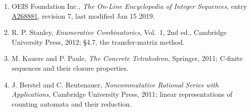 \documentclass[11pt]{article}
\theoremstyle{definition}
\begin{document}
\begin{enumerate}

\item OEIS Foundation Inc., \emph{The On-Line Encyclopedia of Integer Sequences}, entry \href{https://oeis.org/A268881}{A268881}, revision 7, last modified Jan 15 2019.

\item R. P. Stanley, \emph{Enumerative Combinatorics}, Vol.~1, 2nd ed., Cambridge University Press, 2012; \S4.7, the transfer-matrix method.

\item M. Kauers and P. Paule, \emph{The Concrete Tetrahedron}, Springer, 2011; C-finite sequences and their closure properties.

\item J. Berstel and C. Reutenauer, \emph{Noncommutative Rational Series with Applications}, Cambridge University Press, 2011; linear representations of counting automata and their reduction.

\end{enumerate}
\end{document}

